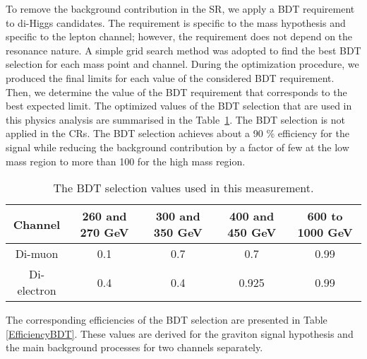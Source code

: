 To remove the background contribution in the SR, we apply a BDT requirement to di-Higgs candidates. The requirement is specific to the mass hypothesis and specific to the lepton channel; however, the requirement does not depend on the resonance nature. A simple grid search method was adopted to find the best BDT selection for each mass point and channel. During the optimization procedure, we produced the final limits for each value of the considered BDT requirement. Then, we determine the value of the BDT requirement that corresponds to the best expected limit. The optimized values of the BDT selection that are used in this physics analysis are summarised in the Table~\ref{suboptCut}. The BDT selection is not applied in the CRs. The BDT selection achieves about a 90 \% efficiency for the signal while reducing the background contribution by a factor of few at the low mass region to more than 100 for the high mass region.

\begin{table}
\begin{center} 
\caption{The BDT selection values used in this measurement.}
\begin{tabular}{ |c|c|c|c|c| } \hline%
Channel & 260 and 270 GeV & 300 and 350 GeV & 400 and 450 GeV & 600 to 1000 GeV \\ \hline
Di-muon & 0.1 & 0.7 & 0.7 & 0.99 \\ %
Di-electron & 0.4 & 0.4 & 0.925 & 0.99\\ \hline%
\end{tabular}
\label{suboptCut}
\end{center} 
\end{table}

The corresponding efficiencies of the BDT selection are presented in Table \ref{EfficiencyBDT}. These values are derived for the graviton signal hypothesis and the main background processes for two channels separately. 

